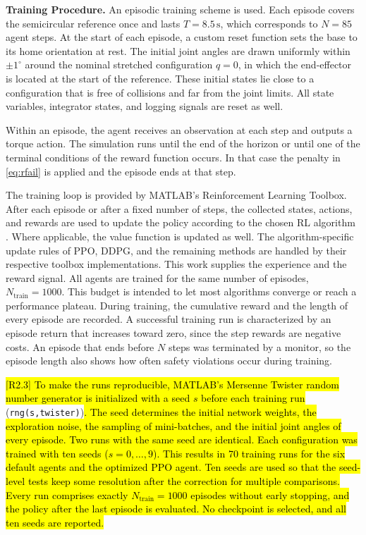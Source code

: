 \documentclass{ieeeaccess}
\newcommand{\hlone}[1]{{\sethlcolor{rone}\hl{#1}}}
\begin{document}
\textbf{Training Procedure.} An episodic training scheme is used. Each episode covers
the semicircular reference once and lasts $T = 8.5\,\mathrm{s}$, which corresponds to $N = 85$ agent
steps. At the start of each episode, a custom reset function sets the base to its home orientation
at rest. The initial joint angles are drawn uniformly within $\pm 1^\circ$ around the nominal stretched
configuration $q = 0$, in which the end-effector is located at the start of the reference. These initial
states lie close to a configuration that is free of collisions and far from the joint limits. All
state variables, integrator states, and logging signals are reset as well.

Within an episode, the agent receives an observation at each step and outputs a torque action.
The simulation runs until the end of the horizon or until one of the terminal conditions of
the reward function occurs. In that case the penalty in \eqref{eq:rfail} is applied and the
episode ends at that step.

The training loop is provided by MATLAB's Reinforcement Learning Toolbox. After each episode or after a
fixed number of steps, the collected states, actions, and rewards are used to update the policy according
to the chosen RL algorithm \cite{b4}. Where applicable, the value function is updated as well. The
algorithm-specific update rules of PPO, DDPG, and the remaining methods are handled by their respective
toolbox implementations. This work supplies the experience and the reward signal. All agents
are trained for the same number of episodes, $N_{\mathrm{train}} = 1000$. This budget is intended to let
most algorithms converge or reach a performance plateau. During training, the cumulative
reward and the length of every episode are recorded. A successful training run is characterized by an
episode return that increases toward zero, since the step rewards are negative costs. An episode that
ends before $N$ steps was terminated by a monitor, so the episode length also shows how often safety
violations occur during training.

\hlone{[R2.3] To make the runs reproducible, MATLAB's Mersenne Twister random number generator
is initialized with a seed $s$ before each training run}
(\texttt{rng(s,\textquotesingle twister\textquotesingle)})\hlone{. The seed determines the initial
network weights, the exploration noise, the sampling of mini-batches, and the initial joint angles of
every episode. Two runs with the same seed are identical. Each configuration was trained with ten seeds
($s = 0,\dots,9$). This results in 70 training runs for the six default agents and the optimized PPO
agent. Ten seeds are used so that the seed-level tests keep some resolution after the correction for
multiple comparisons. Every run comprises exactly $N_{\mathrm{train}} = 1000$ episodes without early
stopping, and the policy after the last episode is evaluated. No checkpoint is selected, and all ten
seeds are reported.}
\end{document}
